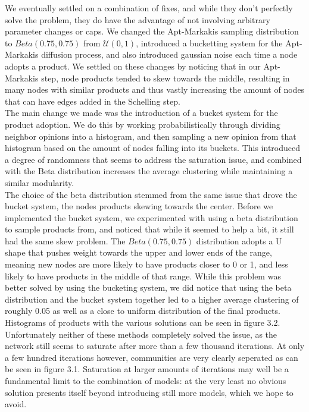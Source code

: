 \documentclass[12pt,twoside]{report}
\begin{document}
We eventually settled on a combination of fixes, and while they don't perfectly solve the problem, they do have the advantage of not involving arbitrary parameter changes or caps. We changed the Apt-Markakis sampling distribution to $Beta(0.75, 0.75)$  from $\mathcal{U}(0, 1)$, introduced a bucketting system for the Apt-Markakis diffusion process, and also introduced gaussian noise each time a node adopts a product. We settled on these changes by noticing that in our Apt-Markakis step, node products tended to skew towards the middle, resulting in many nodes with similar products and thus vastly increasing the amount of nodes that can have edges added in the Schelling step. \\

The main change we made was the introduction of a bucket system for the product adoption. We do this by working probabilistically through dividing neighbor opinions into a histogram, and then sampling a new opinion from that histogram based on the amount of nodes falling into its buckets. This introduced a degree of randomness that seems to address the saturation issue, and combined with the Beta distribution increases the average clustering while maintaining a similar modularity. \\

The choice of the beta distribution stemmed from the same issue that drove the bucket system, the nodes products skewing towards the center. Before we implemented the bucket system, we experimented with using a beta distribution to sample products from, and noticed that while it seemed to help a bit, it still had the same skew problem. The $Beta(0.75, 0.75)$ distribution adopts a U shape that pushes weight towards the upper and lower ends of the range, meaning new nodes are more likely to have products closer to 0 or 1, and less likely to have products in the middle of that range. While this problem was better solved by using the bucketing system, we did notice that using the beta distribution and the bucket system together led to a higher average clustering of roughly 0.05 as well as a close to uniform distribution of the final products. Histograms of products with the various solutions can be seen in figure 3.2. \\

Unfortunately neither of these methods completely solved the issue, as the network still seems to saturate after more than a few thousand iterations. At only a few hundred iterations however, communities are very clearly seperated as can be seen in figure 3.1. Saturation at larger amounts of iterations may well be a fundamental limit to the combination of models: at the very least no obvious solution presents itself beyond introducing still more models, which we hope to avoid. \\
\end{document}
